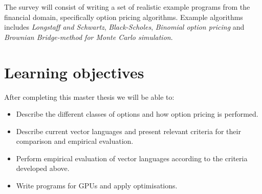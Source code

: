 \documentclass[10pt,a4paper,final,oneside,openany,article]{memoir}
\begin{document}
The survey will consist of writing a set of realistic example programs
from the financial domain, specifically option pricing
algorithms. Example algorithms includes \textit{Longstaff and
  Schwartz}, \textit{Black-Scholes}, \textit{Binomial option pricing}
and \textit{Brownian Bridge-method for Monte Carlo simulation}.




\chapter{Learning objectives}
After completing this master thesis we will be able to:
\begin{itemize}
\item Describe the different classes of options and how option pricing
  is performed.
\item Describe current vector languages and present relevant criteria
  for their comparison and empirical evaluation.
\item Perform empirical evaluation of vector languages according to
  the criteria developed above.
\item Write programs for GPUs and apply optimisations.
\end{itemize}


\newpage
{} 
\printbibliography

\end{document}
